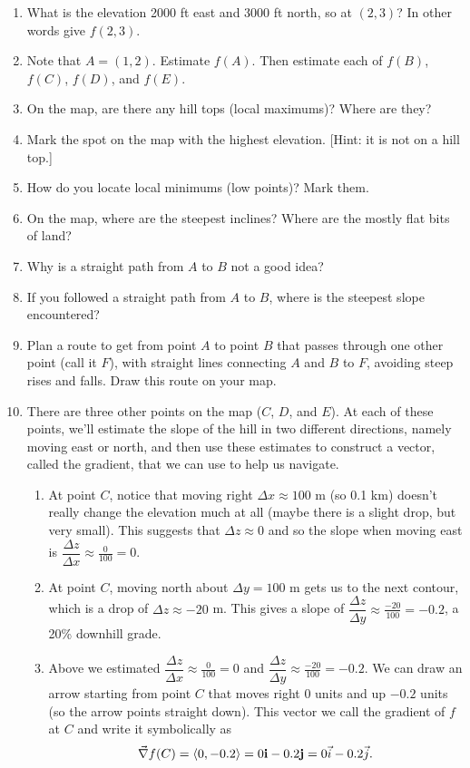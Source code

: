 \documentclass[letterpaper,oneside]{book}%
\newcommand{\ds}{\displaystyle}
\begin{document}
\begin{enumerate}
 \item What is the elevation 2000 ft east and 3000 ft north, so at $(2,3)$? In other words give $f(2,3)$.  
 \item Note that $A=(1,2)$. Estimate $f(A)$. Then estimate each of $f(B)$,   $f(C)$,   $f(D)$, and $f(E)$.
 \item On the map, are there any hill tops (local maximums)?  Where are they? 
 \item Mark the spot on the map with the highest elevation. [Hint: it is not on a hill top.]
 \item How do you locate local minimums (low points)? Mark them.
 \item On the map, where are the steepest inclines? Where are the mostly flat bits of land?
 \item Why is a straight path from $A$ to $B$ not a good idea?
 \item If you followed a straight path from $A$ to $B$, where is the steepest slope encountered? 
 \item Plan a route to get from point $A$ to point $B$ that passes through one other point (call it $F$), with straight lines connecting $A$ and $B$ to $F$, avoiding steep rises and falls. Draw this route on your map. 
 \item There are three other points on the map ($C$, $D$, and $E$).  At each of these points, we'll estimate the slope of the hill in two different directions, namely moving east or north, and then use these estimates to construct a vector, called the gradient, that we can use to help us navigate. 
 \begin{enumerate}
  \item At point $C$, notice that moving right $\Delta x \approx 100$ m (so 0.1 km) doesn't really change the elevation much at all (maybe there is a slight drop, but very small). This suggests that $\Delta z\approx 0$ and so the slope when moving east is $\ds\dfrac{\Delta z}{\Delta x}\approx\frac{0}{100}=0$. 
  \item At point $C$, moving north about $\Delta y = 100$ m gets us to the next contour, which is a drop of $\Delta z \approx -20$ m.  This gives a slope of $\ds\dfrac{\Delta z}{\Delta y} \approx \frac{-20}{100} = -0.2$, a 20\% downhill grade. 
  \item Above we estimated $\ds\dfrac{\Delta z}{\Delta x}\approx\frac{0}{100}=0$ and $\ds\dfrac{\Delta z}{\Delta y} \approx \frac{-20}{100} = -0.2$. We can draw an arrow starting from point $C$ that moves right 0 units and up $-0.2$ units (so the arrow points straight down). This vector we call the gradient of $f$ at $C$ and write it symbolically as $$\vec \nabla f(C) = \left<0,-0.2\right> = 0{\bf i}-0.2{\bf j} = 0\vec i-0.2\vec j.$$

\end{enumerate}
\end{enumerate}
\end{document}
